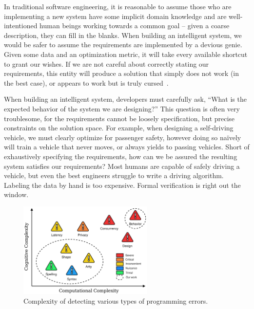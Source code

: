
In traditional software engineering, it is reasonable to assume those who are implementing a new system have some implicit domain knowledge and are well-intentioned human beings working towards a common goal -- given a coarse description, they can fill in the blanks. When building an intelligent system, we would be safer to assume the requirements are implemented by a devious genie. Given some data and an optimization metric, it will take every available shortcut to grant our wishes. If we are not careful about correctly stating our requirements, this entity will produce a solution that simply does not work (in the best case), or appears to work but is truly cursed~\citep{bellman1957dynamic}.

When building an intelligent system, developers must carefully ask, ``What is the expected behavior of the system we are designing?'' This question is often very troublesome, for the requirements cannot be loosely specification, but precise constraints on the solution space. For example, when designing a self-driving vehicle, we must clearly optimize for passenger safety, however doing so na\"ively will train a vehicle that never moves, or always yields to passing vehicles. Short of exhaustively specifying the requirements, how can we be assured the resulting system satisfies our requirements? Most humans are capable of safely driving a vehicle, but even the best engineers struggle to write a driving algorithm. Labeling the data by hand is too expensive. Formal verification is right out the window.

\begin{figure}
    \centering
    \includegraphics[width=0.60\textwidth]{../figures/verification_complexity.png}
    \caption{Complexity of detecting various types of programming errors.}
    \label{fig:verification_complexity}
\end{figure}

